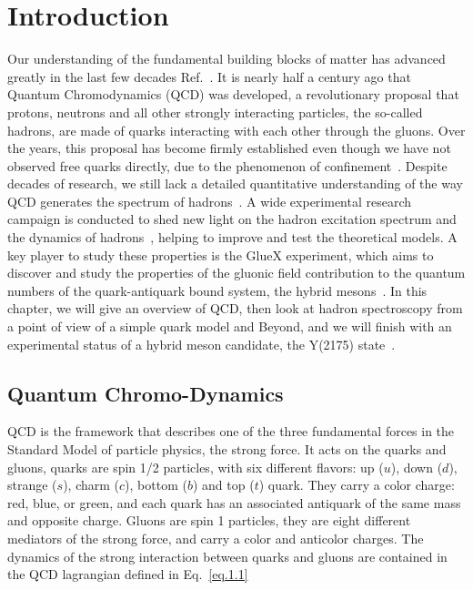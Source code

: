 \chapter{Introduction}
\label{p.1}

Our understanding of the fundamental building blocks of matter has advanced greatly in the last few decades Ref.~\cite{1,2,3,4,5}. It is nearly half a century ago that Quantum Chromodynamics (QCD) was developed, a revolutionary proposal that protons, neutrons and all other strongly interacting particles, the so-called hadrons, are made of quarks interacting with each other through the gluons. Over the years, this proposal has become firmly established even though we have not observed free quarks directly, due to the phenomenon of confinement~\cite{6}. Despite decades of research, we still lack a detailed quantitative understanding of the way QCD generates the spectrum of hadrons~\cite{7}. A wide experimental research campaign is conducted to shed new light on the hadron excitation spectrum and the dynamics of hadrons~\cite{8}, helping to improve and test the theoretical models. A key player to study these properties is the GlueX experiment, which aims to discover and study the properties of the gluonic field contribution to the quantum numbers of the quark-antiquark bound system, the hybrid mesons~\cite{9}. In this chapter, we will give an overview of QCD, then look at hadron spectroscopy from a point of view of a simple quark model and Beyond, and we will finish with an experimental status of a hybrid meson candidate, the Y(2175) state~\cite{10}.

\section{Quantum Chromo-Dynamics}
\label{p.1.1}

QCD is the framework that describes one of the three fundamental forces in the Standard Model of particle physics, the strong force. It acts on the quarks and gluons, quarks are spin 1/2 particles, with six different flavors: up ($u$), down ($d$), strange ($s$), charm ($c$), bottom ($b$) and top ($t$) quark. They carry a color charge: red, blue, or green, and each quark has an associated antiquark of the same mass and opposite charge. Gluons are spin 1 particles, they are eight different mediators of the strong force, and carry a color and anticolor charges. The dynamics of the strong interaction between quarks and gluons are contained in the QCD lagrangian defined in Eq.~\ref{eq.1.1}

